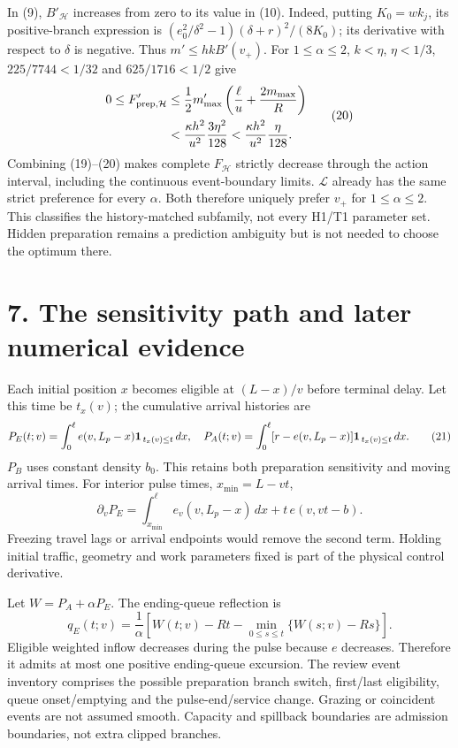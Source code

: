 \documentclass[11pt,a4paper]{article}
\begin{document}
In (9), $B'_{\mathcal H}$ increases from zero to its value in (10).
Indeed, putting $K_0=wk_j$, its positive-branch expression is
$(e_0^2/\delta^2-1)(\delta+r)^2/(8K_0)$; its derivative with respect to
$\delta$ is negative. Thus $m'\leq h k B'(v_+)$.
For $1\leq\alpha\leq2$, $k<\eta$, $\eta<1/3$,
$225/7744<1/32$ and $625/1716<1/2$ give
\[
 \begin{split}
 0\leq F'_{{\rm prep},\mathcal H}
 &\leq\frac12 m'_{\max}\left(\frac{\ell}{u}+\frac{2m_{\max}}R\right)\\
 &<\frac{\kappa h^2}{u^2}\frac{3\eta^2}{128}
 <\frac{\kappa h^2}{u^2}\frac{\eta}{128}.
 \end{split}
 \tag{20}
\]
Combining (19)--(20) makes complete $F_{\mathcal H}$ strictly decrease
through the action interval, including the continuous event-boundary
limits. $\mathcal L$ already has the same strict preference for every
$\alpha$. Both therefore uniquely prefer $v_+$ for $1\leq\alpha\leq2$.
This classifies the history-matched subfamily, not every H1/T1 parameter set.
Hidden preparation remains a prediction ambiguity but is not needed to
choose the optimum there.

\section*{7. The sensitivity path and later numerical evidence}
Each initial position $x$ becomes eligible at $(L-x)/v$ before terminal delay.
Let this time be $t_x(v)$; the cumulative arrival histories are
\[
 P_E(t;v)=\int_0^\ell e(v,L_p-x)
       {\bf1}_{\,t_x(v)\leq t}\,dx,\quad
 P_A(t;v)=\int_0^\ell[r-e(v,L_p-x)]
       {\bf1}_{\,t_x(v)\leq t}\,dx .
 \tag{21}
\]
$P_B$ uses constant density $b_0$. This retains both preparation sensitivity
and moving arrival times. For interior pulse times, $x_{\min}=L-vt$,
\[
 \partial_vP_E=\int_{x_{\min}}^\ell e_v(v,L_p-x)\,dx
                        +t\,e(v,vt-b).
 \tag{22}
\]
Freezing travel lags or arrival endpoints would remove the second term.
Holding initial traffic, geometry and work parameters fixed is part of
the physical control derivative.

Let $W=P_A+\alpha P_E$. The ending-queue reflection is
\[
 q_E(t;v)=\frac1\alpha\left[
 W(t;v)-Rt-\min_{0\leq s\leq t}\{W(s;v)-Rs\}\right].
 \tag{23}
\]
Eligible weighted inflow decreases during the pulse because $e$ decreases.
Therefore it admits at most one positive ending-queue excursion.
The review event inventory comprises the possible preparation branch switch,
first/last eligibility, queue onset/emptying and the pulse-end/service change.
Grazing or coincident events are not assumed smooth. Capacity and spillback
boundaries are admission boundaries, not extra clipped branches.
\end{document}
